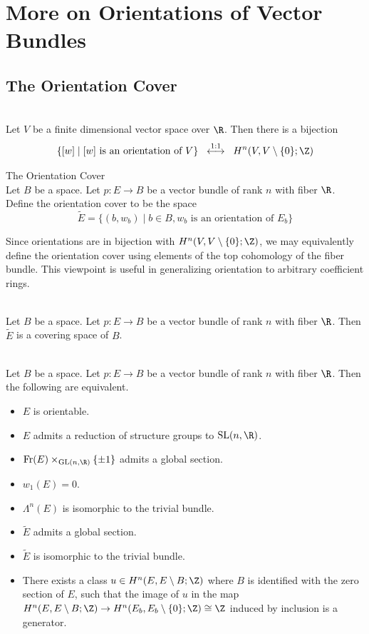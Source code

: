 \documentclass[a4paper]{article}
\begin{document}
\pagebreak
\section{More on Orientations of Vector Bundles}
\subsection{The Orientation Cover}
\begin{lmm}{}{}\\
Let $V$ be a finite dimensional vector space over $\R$. Then there is a bijection $$\{[w]\;|\;[w]\text{ is an orientation of }V\}\;\;\overset{1:1}{\longleftrightarrow}\;\;H^n(V,V\setminus\{0\};\Z)$$
\end{lmm}

\begin{defn}{The Orientation Cover}{}\\
Let $B$ be a space. Let $p:E\to B$ be a vector bundle of rank $n$ with fiber $\R$. Define the orientation cover to be the space $$\widetilde{E}=\{(b,w_b)\;|\;b\in B, w_b\text{ is an orientation of }E_b\}$$
\end{defn}

Since orientations are in bijection with $H^n(V,V\setminus\{0\};\Z)$, we may equivalently define the orientation cover using elements of the top cohomology of the fiber bundle. This viewpoint is useful in generalizing orientation to arbitrary coefficient rings. 

\begin{lmm}{}{}\\
Let $B$ be a space. Let $p:E\to B$ be a vector bundle of rank $n$ with fiber $\R$. Then $\widetilde{E}$ is a covering space of $B$. 
\end{lmm}

\begin{prp}{}{}\\
Let $B$ be a space. Let $p:E\to B$ be a vector bundle of rank $n$ with fiber $\R$. Then the following are equivalent. 
\begin{itemize}
\item $E$ is orientable. 
\item $E$ admits a reduction of structure groups to $\text{SL}(n,\R)$. 
\item $\text{Fr}(E)\times_{\text{GL}(n,\R)}\{\pm1\}$ admits a global section. 
\item $w_1(E)=0$. 
\item $\Lambda^n(E)$ is isomorphic to the trivial bundle. 
\item $\widetilde{E}$ admits a global section. 
\item $\widetilde{E}$ is isomorphic to the trivial bundle. 
\item There exists a class $u\in H^n(E,E\setminus B;\Z)$ where $B$ is identified with the zero section of $E$, such that the image of $u$ in the map $H^n(E,E\setminus B;\Z)\to H^n(E_b,E_b\setminus\{0\};\Z)\cong\Z$ induced by inclusion is a generator. 
\end{itemize}
\end{prp}
\end{document}
